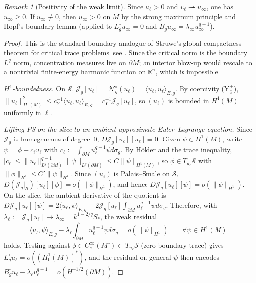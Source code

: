 \documentclass[11pt,reqno,a4paper]{amsart}
\numberwithin{equation}{section}
\theoremstyle{plain}
\theoremstyle{remark}
\newtheorem{remark}[theorem]{Remark}
\theoremstyle{plain}
\begin{document}
\begin{remark}[Positivity of the weak limit]\label{rem:uinfty-positive}
Since $u_\ell>0$ and $u_\ell\rightharpoonup u_\infty$, one has $u_\infty\ge0$.
If $u_\infty\not\equiv0$, then $u_\infty>0$ on $\overline M$ by the strong maximum principle and
Hopf's boundary lemma (applied to $L_g^\circ u_\infty=0$ and $B_g^\circ u_\infty=\lambda_\infty u_\infty^{q-1}$).
\end{remark}

\begin{proof}
This is the standard boundary analogue of Struwe's global compactness theorem for
critical trace problems; see \cite{Struwe1984,Lions84I,Lions84II,SM17}.
Since the critical norm is the boundary $L^q$ norm, concentration measures live on
$\partial M$; an interior blow-up would rescale to a nontrivial finite-energy harmonic
function on $\mathbb R^n$, which is impossible.

\smallskip\noindent\emph{$H^1$-boundedness.}
On $\mathcal S$, $\mathcal J_g[u_\ell]=\mathcal N_g^\circ(u_\ell)=\langle u_\ell,u_\ell\rangle_{E,g}$.
By coercivity \textup{(Y$^+_{\partial}$)}, $\|u_\ell\|_{H^1(M)}^2\le c_Y^{-1}\langle u_\ell,u_\ell\rangle_{E,g}=c_Y^{-1}\mathcal J_g[u_\ell]$,
so $(u_\ell)$ is bounded in $H^1(M)$ uniformly in $\ell$.

\smallskip\noindent\emph{Lifting PS on the slice to an ambient approximate Euler--Lagrange equation.}
Since $\mathcal J_g$ is homogeneous of degree~$0$, $D\mathcal J_g[u_\ell][u_\ell]=0$.
Given $\psi\in H^1(M)$, write
$\psi=\phi+c_\ell u_\ell$ with
$c_\ell:=\int_{\partial M}u_\ell^{q-1}\psi d\sigma_g$.
By H\"older and the trace inequality,
$|c_\ell|\le\|u_\ell\|_{L^q(\partial M)}^{q-1}\|\psi\|_{L^q(\partial M)}
\le C\|\psi\|_{H^1(M)}$,
so $\phi\in T_{u_\ell}\mathcal S$ with $\|\phi\|_{H^1}\le C'\|\psi\|_{H^1}$. Since $(u_\ell)$ is Palais--Smale on $\mathcal S$,
$D(\mathcal J_g|_{\mathcal S})[u_\ell][\phi]=o(\|\phi\|_{H^1})$, and hence
$D\mathcal J_g[u_\ell][\psi]=o(\|\psi\|_{H^1})$.
On the slice, the ambient derivative of the quotient is
$D\mathcal J_g[u_\ell][\psi]
=2\langle u_\ell,\psi\rangle_{E,g}
-2\mathcal J_g[u_\ell]\int_{\partial M}u_\ell^{q-1}\psi d\sigma_g$.
Therefore, with $\lambda_\ell:=\mathcal J_g[u_\ell]\to\lambda_\infty=k^{1-2/q}S_\ast$, the weak residual
\[
\langle u_\ell,\psi\rangle_{E,g}-\lambda_\ell\int_{\partial M}u_\ell^{q-1}\psi d\sigma_g=o(\|\psi\|_{H^1})
\qquad\forall\psi\in H^1(M)
\]
holds. Testing against $\phi\in C_c^\infty(M^\circ)\subset T_{u_\ell}\mathcal S$ (zero boundary trace) gives
$L_g^\circ u_\ell=o((H^1_0(M))^*)$, and the residual on general $\psi$ then encodes
$B_g^\circ u_\ell-\lambda_\ell u_\ell^{q-1}=o(H^{-1/2}(\partial M))$.


\end{proof}
\end{document}
